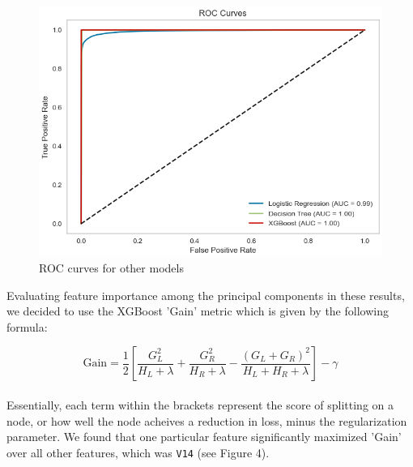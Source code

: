 \documentclass{article}
\begin{document}
\begin{figure}[htbp]
\centering
\includegraphics[width=\linewidth]{image/anon_roc_other_models.png} %
\caption{ROC curves for other models}
\label{fig:my_photo} %
\end{figure}


Evaluating feature importance among the principal components in these results, we decided to use the XGBoost 'Gain' metric which is given by the following formula:

\[
\text{Gain} = \frac{1}{2} \left[ \frac{G_L^2}{H_L + \lambda} + \frac{G_R^2}{H_R + \lambda} - \frac{(G_L + G_R)^2}{H_L + H_R + \lambda} \right] - \gamma
\]
\\

Essentially, each term within the brackets represent the score of splitting on a node, or how well the node acheives a reduction in loss, minus the regularization parameter. We found that one particular feature significantly maximized 'Gain' over all other features, 
which was \texttt{V14} (see Figure 4).
\end{document}
